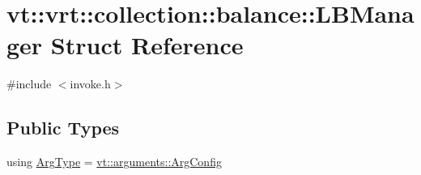 \hypertarget{structvt_1_1vrt_1_1collection_1_1balance_1_1_l_b_manager}{}\section{vt\+:\+:vrt\+:\+:collection\+:\+:balance\+:\+:L\+B\+Manager Struct Reference}
\label{structvt_1_1vrt_1_1collection_1_1balance_1_1_l_b_manager}


{\ttfamily \#include $<$invoke.\+h$>$}

\subsection*{Public Types}
\begin{DoxyCompactItemize}
\item 
using \hyperlink{structvt_1_1vrt_1_1collection_1_1balance_1_1_l_b_manager_a25c1321de5a8a52b7c2c5d0d400d55d4}{Arg\+Type} = \hyperlink{structvt_1_1arguments_1_1_arg_config}{vt\+::arguments\+::\+Arg\+Config}
\end{DoxyCompactItemize}
